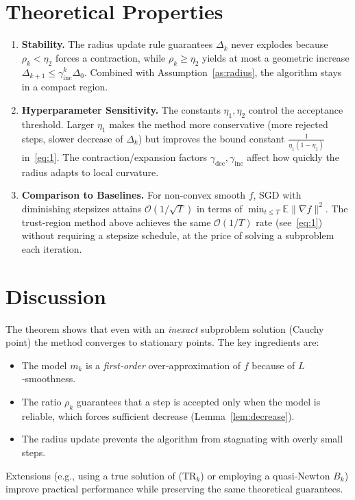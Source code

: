 \documentclass{article}
\newcommand{\E}{\mathbb{E}}
\begin{document}
\section*{Theoretical Properties}
\begin{enumerate}[label=\arabic*)]
\item \textbf{Stability.}  
The radius update rule guarantees $\Delta_k$ never explodes because $\rho_k<\eta_2$ forces a contraction, while $\rho_k\ge\eta_2$ yields at most a geometric increase $\Delta_{k+1}\le\gamma_{\text{inc}}^k\Delta_0$. Combined with Assumption~\ref{as:radius}, the algorithm stays in a compact region.

\item \textbf{Hyperparameter Sensitivity.}  
The constants $\eta_1,\eta_2$ control the acceptance threshold. Larger $\eta_1$ makes the method more conservative (more rejected steps, slower decrease of $\Delta_k$) but improves the bound constant $\frac{1}{\eta_1(1-\eta_1)}$ in~\eqref{eq:1}. The contraction/expansion factors $\gamma_{\text{dec}},\gamma_{\text{inc}}$ affect how quickly the radius adapts to local curvature.

\item \textbf{Comparison to Baselines.}  
For non‑convex smooth $f$, SGD with diminishing stepsizes attains $\mathcal{O}(1/\sqrt{T})$ in terms of $\min_{t\le T}\E\|\nabla f\|^2$. The trust‑region method above achieves the same $\mathcal{O}(1/T)$ rate (see~\eqref{eq:1}) without requiring a stepsize schedule, at the price of solving a subproblem each iteration.

\end{enumerate}

\section*{Discussion}
The theorem shows that even with an \emph{inexact} subproblem solution (Cauchy point) the method converges to stationary points. The key ingredients are:
\begin{itemize}
\item The model $m_k$ is a \emph{first‑order} over‑approximation of $f$ because of $L$‑smoothness.
\item The ratio $\rho_k$ guarantees that a step is accepted only when the model is reliable, which forces sufficient decrease (Lemma~\ref{lem:decrease}).
\item The radius update prevents the algorithm from stagnating with overly small steps.
\end{itemize}
Extensions (e.g., using a true solution of (TR$_k$) or employing a quasi‑Newton $B_k$) improve practical performance while preserving the same theoretical guarantees.
\end{document}
